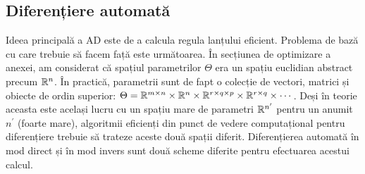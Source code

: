\documentclass[../../book-main_ro.tex]{subfiles}
\begin{document}
\subsection{Diferențiere automată}

Ideea principală a AD este de a calcula regula lanțului eficient.
Problema de bază cu care trebuie să facem față este următoarea. În secțiunea de optimizare a anexei, am considerat că spațiul parametrilor \(\Theta\) era un spațiu euclidian abstract precum \(\mathbb{R}^{n}\). În practică, parametrii sunt de fapt o colecție de vectori, matrici și obiecte de ordin superior: \(\Theta = \mathbb{R}^{m \times n} \times \mathbb{R}^{n} \times \mathbb{R}^{r \times q \times p} \times \mathbb{R}^{r \times q} \times \cdots\). Deși în teorie aceasta este același lucru cu un spațiu mare de parametri \(\mathbb{R}^{n^{\prime}}\) pentru un anumit \(n^{\prime}\) (foarte mare), algoritmii eficienți din punct de vedere computațional pentru diferențiere trebuie să trateze aceste două spații diferit.
Diferențierea automată în mod direct și în mod invers sunt două scheme diferite pentru efectuarea acestui calcul.
\end{document}
